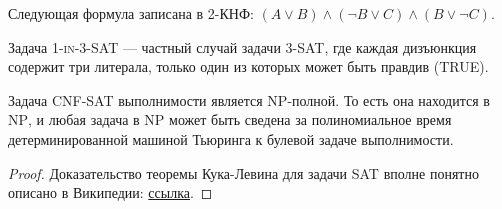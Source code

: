     \begin{Example}
        Следующая формула записана в 2-КНФ:
        $(A\lor B)\land (\neg B\lor C)\land (B\lor \neg C)$.
    \end{Example}
    \begin{Def}
        Задача \textsc{1-in-3-SAT} --- частный случай задачи \textsc{3-SAT}, где каждая дизъюнкция содержит три литерала, только один из которых может быть правдив (TRUE).
    \end{Def}
    \begin{Thm}
        Задача \textsc{CNF-SAT} выполнимости является \textsc{NP}-полной. То есть она находится в \textsc{NP}, и любая задача в \textsc{NP} может быть сведена за полиномиальное время детерминированной машиной Тьюринга к булевой задаче выполнимости.
    \end{Thm}
    \begin{proof}
        Доказательство теоремы Кука-Левина для задачи \textsc{SAT} вполне понятно описано в Википедии: 
        \href{https://en.wikipedia.org/wiki/Cook%E2%80%93Levin_theorem}{ссылка}. 
    \end{proof}

    
